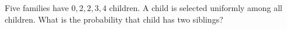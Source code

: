 Five families have $0,2,2,3,4$ children. A child is selected uniformly among all children. What is the probability that child has two siblings?
